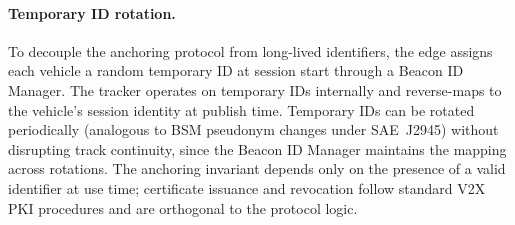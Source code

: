 \paragraph{Temporary ID rotation.}
To decouple the anchoring protocol from long-lived identifiers, the edge assigns each vehicle a random temporary ID at session start through a Beacon ID Manager. The tracker operates on temporary IDs internally and reverse-maps to the vehicle's session identity at publish time. Temporary IDs can be rotated periodically (analogous to BSM pseudonym changes under SAE~J2945) without disrupting track continuity, since the Beacon ID Manager maintains the mapping across rotations. The anchoring invariant depends only on the presence of a valid identifier at use time; certificate issuance and revocation follow standard V2X PKI procedures and are orthogonal to the protocol logic.





